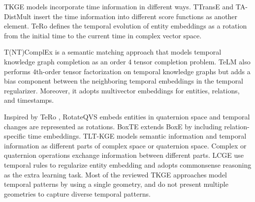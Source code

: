 \documentclass[letterpaper]{article} %
\begin{document}


TKGE models incorporate time information in different ways.
TTransE \cite{leblay2018deriving} and TA-DistMult \cite{garcia2018learning} insert the time information into different score functions as another element. 
TeRo \cite{xu2020tero} defines the temporal evolution of entity embeddings as a rotation from the initial time to the current time in complex vector space.

T(NT)ComplEx \cite{lacroix2019tensor} is a semantic matching approach that models temporal knowledge graph completion as an order 4 tensor completion problem. 
TeLM \cite{xu2021temporal} also performs 4th-order tensor factorization on temporal knowledge graphs but adds a bias component between the neighboring temporal embeddings in the temporal regularizer. Moreover, it adopts multivector embeddings for entities, relations, and timestamps.

Inspired by TeRo \cite{xu2020tero}, RotateQVS \cite{chen2022rotateqvs} embeds entities in quaternion space and temporal changes are represented as rotations.
BoxTE \cite{messner2022temporal} extends BoxE \cite{abboud2020boxe} by including  relation-specific time embeddings.
TLT-KGE \cite{tltcomplexzhang2022along} models semantic information and temporal information as different parts of complex space or quaternion space. Complex or quaternion operations exchange information between different parts. 
LCGE \cite{niu2022logic} use temporal rules to regularize entity embedding and adopts commonsense reasoning as the extra learning task. Most of the reviewed TKGE approaches model temporal patterns by using a single geometry, and do not present multiple geometries to capture diverse temporal patterns. 
\end{document}
